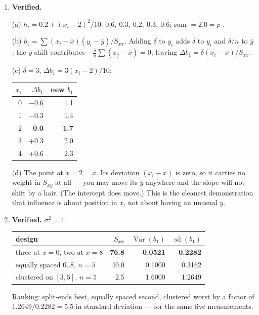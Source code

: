 \documentclass[11pt,a4paper]{article}
\newcommand{\A}[1]{\item[\textbf{#1}]}
\begin{document}
\begin{enumerate}[leftmargin=1.9cm]
\A{U5.49} \textbf{Verified.}
\begin{answerbox}
(a) $h_i = 0.2 + (x_i-2)^2/10$:
$\mathbf{0.6,\ 0.3,\ 0.2,\ 0.3,\ 0.6}$; sum $= \mathbf{2.0} = p$ \checkmark.

(b) $b_1 = \sum(x_i-\bar x)(y_i-\bar y)/S_{xx}$. Adding $\delta$ to $y_i$ adds
$\delta$ to $y_i$ and $\delta/n$ to $\bar y$; the $\bar y$ shift contributes
$-\frac{\delta}{n}\sum(x_j-\bar x) = 0$, leaving
$\Delta b_1 = \delta(x_i-\bar x)/S_{xx}$.

(c) $\delta = 3$, $\Delta b_1 = 3(x_i-2)/10$:
\begin{center}\begin{tabular}{@{}rrr@{}}\toprule
$x_i$ & $\Delta b_1$ & new $b_1$\\
\midrule
0 & $-0.6$ & 1.1\\ 1 & $-0.3$ & 1.4\\ 2 & \textbf{0.0} & \textbf{1.7}\\
3 & $+0.3$ & 2.0\\ 4 & $+0.6$ & 2.3\\
\bottomrule\end{tabular}\end{center}

(d) The point at $x = 2 = \bar x$. Its deviation $(x_i - \bar x)$ is zero, so
it carries no weight in $S_{xy}$ at all --- you may move its $y$ anywhere and
the slope will not shift by a hair. (The intercept does move.) This is the
cleanest demonstration that influence is about position in $x$, not about
having an unusual $y$.
\end{answerbox}

\A{U5.50} \textbf{Verified.} $\sigma^2 = 4$.
\begin{answerbox}
\begin{center}\begin{tabular}{@{}lrrr@{}}\toprule
design & $S_{xx}$ & $\operatorname{Var}(b_1)$ & $\operatorname{sd}(b_1)$\\
\midrule
three at $x=0$, two at $x=8$ & \textbf{76.8} & \textbf{0.0521} & \textbf{0.2282}\\
equally spaced $0..8$, $n=5$ & 40.0 & 0.1000 & 0.3162\\
clustered on $[3,5]$, $n=5$ & 2.5 & 1.6000 & 1.2649\\
\bottomrule\end{tabular}\end{center}
Ranking: split-ends best, equally spaced second, clustered worst by a factor of
$1.2649/0.2282 = 5.5$ in standard deviation --- for the same five
measurements.


\end{answerbox}
\end{enumerate}
\end{document}
